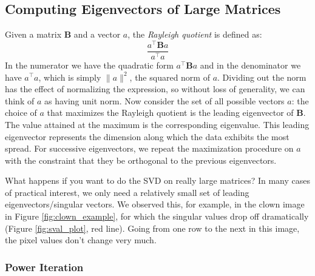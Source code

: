 \documentclass[a4paper]{article}
\begin{document}
\subsection{Computing Eigenvectors of Large Matrices}
Given a matrix ${\mathbf B}$ and a vector $a$, the \emph{Rayleigh quotient} is defined as:
$$
\frac{a^\top {\mathbf B} a}{a^\top a}
$$
In the numerator we have the quadratic form $a^\top {\mathbf B} a$ and in the denominator we have $a^\top a$, which is simply $\|a\|^2$, the squared norm of $a$.  Dividing out the norm has the effect of normalizing the expression, so without loss of generality, we can think of $a$ as having unit norm.  Now consider the set of all possible vectors $a$: the choice of $a$ that maximizes the Rayleigh quotient is the leading eigenvector of $\mathbf{B}$.  The value attained at the maximum is the corresponding eigenvalue.  This leading eigenvector represents the dimension along which the data exhibits the most spread. For successive eigenvectors, we repeat the maximization procedure on $a$ with the constraint that they be orthogonal to the previous eigenvectors. 

What happens if you want to do the SVD on really large matrices?  In many cases of practical interest, we only need a relatively small set of leading eigenvectors/singular vectors.  We observed this, for example, in the clown image in Figure \ref{fig:clown_example}, for which the singular values drop off dramatically (Figure \ref{fig:sval_plot}, red line).  Going from one row to the next in this image, the pixel values don't change very much.

\subsubsection{Power Iteration}
\end{document}
